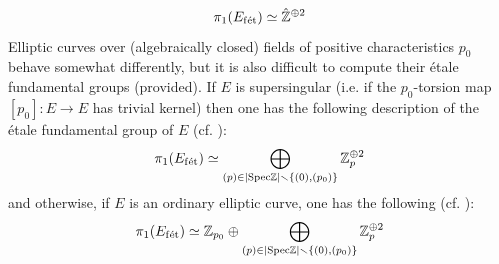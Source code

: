 \begin{example}
\begin{itemize}
                            $$\pi_1(E_{\mathrm{f\acute{e}t}}) \simeq \hat{\mathbb{Z}}^{\oplus 2}$$
                        Elliptic curves over (algebraically closed) fields of positive characteristics $p_0$ behave somewhat differently, but it is also difficult to compute their \'etale fundamental groups (provided). If $E$ is supersingular (i.e. if the $p_0$-torsion map $[p_0]: E \to E$ has trivial kernel) then one has the following description of the \'etale fundamental group of $E$ (cf. \cite[Proposition 5.13]{kundu_etale_fundamental_group_of_elliptic_curves}):
                            $$\pi_1(E_{\mathrm{f\acute{e}t}}) \simeq \bigoplus_{(p) \in |\mathrm{Spec} \mathbb{Z}| \smallsetminus \{(0), (p_0)\}} \mathbb{Z}_p^{\oplus 2}$$
                        and otherwise, if $E$ is an ordinary elliptic curve, one has the following (cf. \cite[Proposition 5.14]{kundu_etale_fundamental_group_of_elliptic_curves}):
                            $$\pi_1(E_{\mathrm{f\acute{e}t}}) \simeq \mathbb{Z}_{p_0} \oplus \bigoplus_{(p) \in |\mathrm{Spec} \mathbb{Z}| \smallsetminus \{(0), (p_0)\}} \mathbb{Z}_p^{\oplus 2}$$
                    \end{itemize}
                \end{example}
            
